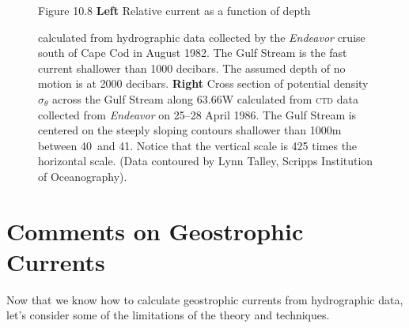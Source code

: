 \begin{figure}[t!]
{}
\footnotesize
Figure 10.8 \textbf{Left} Relative current as a function of
depth\rule{0mm}{4ex} calculated from hydrographic data collected by the \textit{Endeavor} cruise
south of Cape Cod in August 1982. The Gulf Stream is the fast current shallower than 1000
decibars. The assumed depth of no motion is at 2000 decibars.
\textbf{Right} Cross section of potential density $\sigma_{\theta}$
across the Gulf Stream along 63.66\degrees W calculated from
\textsc{ctd} data collected from \textit{Endeavor} on
25--28 April 1986. The Gulf Stream is centered on the steeply sloping
contours shallower than 1000m between 40\degrees\ and 41\degrees.
Notice that the vertical scale is 425 times the horizontal
scale. (Data contoured by Lynn Talley, Scripps Institution of
Oceanography).
\label{profileandsection}
\vspace{-3ex}
\end{figure}

\vspace{-2ex}
\section{Comments on Geostrophic Currents}
Now that we know how to calculate geostrophic
currents from hydrographic
data, let's consider
some of the limitations of the theory and techniques.
